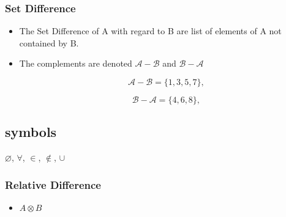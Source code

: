 

\subsubsection*{Set Difference}

\begin{itemize}


\item The Set Difference of A with regard to B are list of elements of A not contained by B.


\item The complements are denoted $\mathcal{A-B}$ and $\mathcal{B-A}$

\[ \mathcal{A-B} = \{1,3,5,7\}, \]


\[ \mathcal{B-A} = \{4,6,8\}, \]

\end{itemize}

\subsection*{symbols}
$\varnothing$,
$\forall$,
$\in$,
$\notin$,
$\cup$


\newpage



\subsubsection*{Relative Difference}
\begin{itemize}
\item $ A \otimes B$
\end{itemize}

